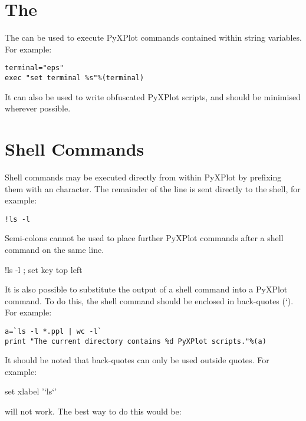 \section{The }

The  can be used to execute PyXPlot commands contained within
string variables. For example:

\begin{verbatim}
terminal="eps"
exec "set terminal %s"%(terminal)
\end{verbatim}

\noindent It can also be used to write obfuscated PyXPlot scripts, and should
be minimised wherever possible.

\section{Shell Commands}

Shell commands may be executed directly from
within PyXPlot by prefixing them with an \indcmdts{!} character. The
remainder of the line is sent directly to the shell, for example:

\begin{verbatim}
!ls -l
\end{verbatim}

\noindent Semi-colons cannot be used to place further PyXPlot commands after a
shell command on the same line.

\begin{dontdo}
!ls -l ; set key top left
\end{dontdo}

It is also possible to substitute the output of a shell command into a PyXPlot
command. To do this, the shell command should be enclosed in back-quotes (`).
For example:

\begin{verbatim}
a=`ls -l *.ppl | wc -l`
print "The current directory contains %d PyXPlot scripts."%(a)
\end{verbatim}

It should be noted that back-quotes can only be used outside quotes. For
example:

\begin{dontdo}
set xlabel '`ls`'
\end{dontdo}

\noindent will not work. The best way to do this would be:

